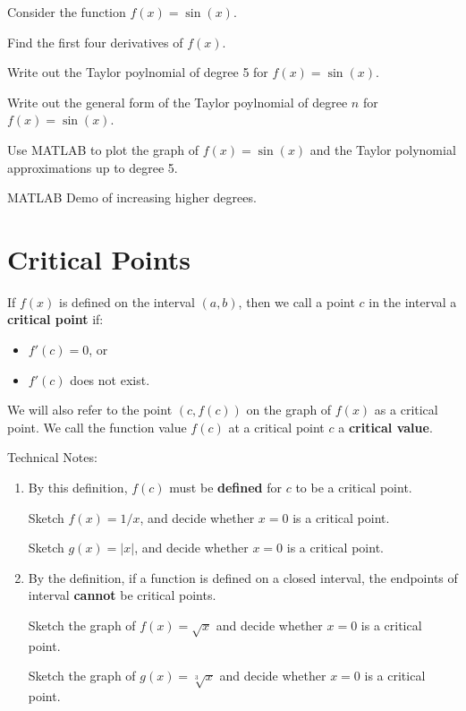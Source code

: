 Consider the function $f(x) = \sin(x)$.

\problem Find the first four derivatives of $f(x)$.

\newpage

\problem Write out the Taylor poylnomial of degree 5 for
$f(x) = \sin(x)$.

\vfill

\problem Write out the general form of the Taylor poylnomial of degree
$n$ for $f(x) = \sin(x)$.

\vfill

\newpage

\problem Use MATLAB to plot the graph of $f(x) = \sin(x)$ and the
Taylor polynomial approximations up to degree 5.

\newpage

MATLAB Demo of increasing higher degrees.


\newpage
{}

\section*{Critical Points} 

\begin{boxnote}

  If $f(x)$ is defined on the interval $(a,b)$, then we call a point
  $c$ in the interval a {\bf critical point} if:
\begin{itemize}
	\item $f'(c) = 0$, or
	\item $f'(c)$ does not exist.
\end{itemize}
We will also refer to the point $(c,f(c))$ on the graph of $f(x)$ as a
critical point.  We call the function value $f(c)$ at a critical point
$c$ a {\bf critical value}.

\vsc
\end{boxnote}

\newpage

Technical Notes:
\begin{enumerate} 
\item By this definition, $f(c)$ must be {\bf defined} for
  $c$ to be a critical point.  

  Sketch $f(x) = 1/x$, and decide whether $x=0$ is a
    critical point.

\vfill
  Sketch $g(x) = |x|$, and decide whether $x=0$ is a
    critical point.

\vfill

\newpage

\item By the definition, if a function is defined on a closed
  interval, the endpoints of interval {\bf cannot} be critical points.

  Sketch the graph of $f(x) = \sqrt{x}$ and decide
    whether $x=0$ is a critical point.

\vfill

\newpage

Sketch the graph of $g(x) = \sqrt[3]{x}$ and decide
  whether $x=0$ is a critical point.

\vfill

\end{enumerate}

